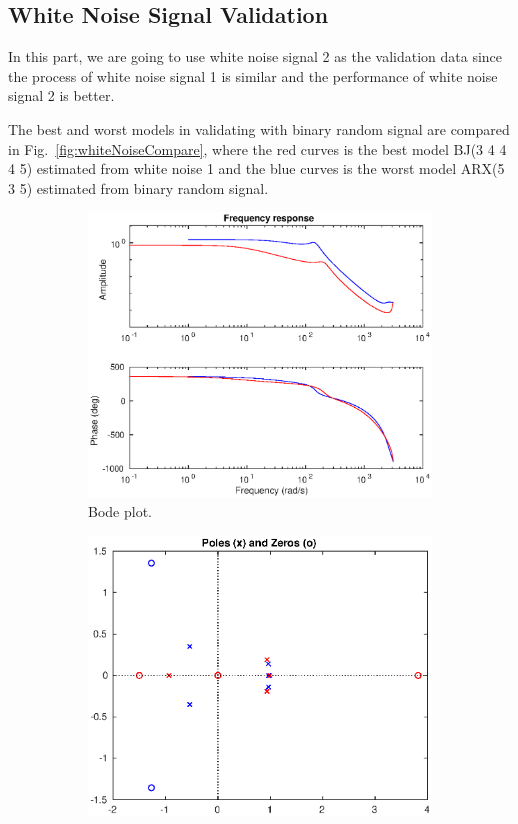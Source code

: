 \documentclass[10pt,a4paper]{article}
\begin{document}
\subsection{White Noise Signal Validation}
\par In this part, we are going to use white noise signal 2 as the validation data since the process of white noise signal 1 is similar and the performance of white noise signal 2 is better.
\par The best and worst models in validating with binary random signal are compared in Fig.~\ref{fig:whiteNoiseCompare}, where the red curves is the best model BJ(3 4 4 4 5) estimated from white noise 1 and the blue curves is the worst model ARX(5 3 5) estimated from binary random signal.
	\begin{figure}[ht]
		\footnotesize
		\centering
		\begin{subfigure}[t]{.32\linewidth}
		\centering\includegraphics[width=\linewidth]{whiteNoiseFrequencyResponse.eps}
		\caption{Bode plot.}
		\end{subfigure}
		\begin{subfigure}[t]{.32\linewidth}
		\centering\includegraphics[width=\linewidth]{whiteNoisePolesZeros.eps}

\end{subfigure}
\end{figure}
\end{document}
